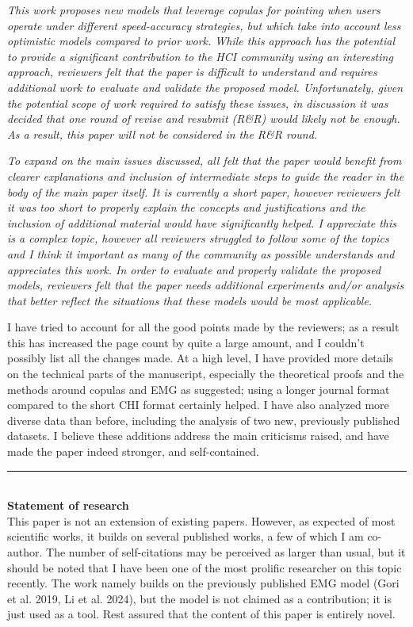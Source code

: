 \documentclass{article}
\begin{document}
\textit{This work proposes new models that leverage copulas for pointing when users operate under different speed-accuracy strategies, but which take into account less optimistic models compared to prior work. While this approach has the potential to provide a significant contribution to the HCI community using an interesting approach, reviewers felt that the paper is difficult to understand and requires additional work to evaluate and validate the proposed model. Unfortunately, given the potential scope of work required to satisfy these issues, in discussion it was decided that one round of revise and resubmit (R\&R) would likely not be enough. As a result, this paper will not be considered in the R\&R round.}

\textit{To expand on the main issues discussed, all felt that the paper would benefit from clearer explanations and inclusion of intermediate steps to guide the reader in the body of the main paper itself. It is currently a short paper, however reviewers felt it was too short to properly explain the concepts and justifications and the inclusion of additional material would have significantly helped. I appreciate this is a complex topic, however all reviewers struggled to follow some of the topics and I think it important as many of the community as possible understands and appreciates this work. In order to evaluate and properly validate the proposed models, reviewers felt that the paper needs additional experiments and/or analysis that better reflect the situations that these models would be most applicable.}


I have tried to account for all the good points made by the reviewers; as a result this has increased the page count by quite a large amount, and I couldn't possibly list all the changes made. At a high level, I have provided more details on the technical parts of the manuscript, especially the theoretical proofs and the methods around copulas and EMG as suggested; using a longer journal format compared to the short CHI format certainly helped. I have also analyzed more diverse data than before, including the analysis of two new, previously published datasets. I believe these additions address the main criticisms raised, and have made the paper indeed stronger, and self-contained.


\noindent\rule{\textwidth}{0.4pt}\\
\textbf{Statement of research}\\
This paper is not an extension of existing papers. However, as expected of most scientific works, it builds on several published works, a few of which I am co-author. The number of self-citations may be perceived as larger than usual, but it should be noted that I have been one of the most prolific researcher on this topic recently. The work namely builds on the previously published EMG model (Gori et al. 2019, Li et al. 2024), but the model is not claimed as a contribution; it is just used as a tool. Rest assured that the content of this paper is entirely novel.
\end{document}
